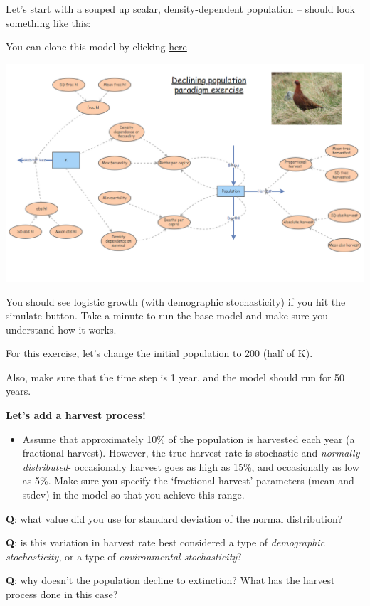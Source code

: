 \documentclass[
]{article}
\providecommand{\tightlist}{%
  \setlength{\itemsep}{0pt}\setlength{\parskip}{0pt}}
\begin{document}
Let's start with a souped up scalar, density-dependent population --
should look something like this:

You can clone this model by clicking
\href{https://insightmaker.com/insight/74417/declining-population-paradigm}{here}

\includegraphics{IM5.PNG}

You should see logistic growth (with demographic stochasticity) if you
hit the simulate button. Take a minute to run the base model and make
sure you understand how it works.

For this exercise, let's change the initial population to 200 (half of
K).

Also, make sure that the time step is 1 year, and the model should run
for 50 years.

\textbf{Let's add a harvest process!}

\begin{itemize}
\tightlist
\item
  Assume that approximately 10\% of the population is harvested each
  year (a fractional harvest). However, the true harvest rate is
  stochastic and \emph{normally distributed}- occasionally harvest goes
  as high as 15\%, and occasionally as low as 5\%. Make sure you specify
  the `fractional harvest' parameters (mean and stdev) in the model so
  that you achieve this range.
\end{itemize}

\textbf{Q}: what value did you use for standard deviation of the normal
distribution?

\textbf{Q}: is this variation in harvest rate best considered a type of
\emph{demographic stochasticity}, or a type of \emph{environmental
stochasticity}?

\textbf{Q}: why doesn't the population decline to extinction? What has
the harvest process done in this case?
\end{document}
